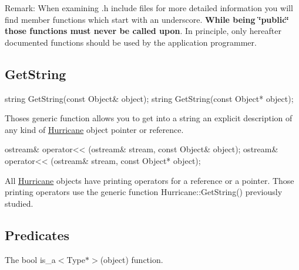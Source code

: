 \begin{DoxyParagraph}{Remark\+: When examining {\ttfamily }.h include files for more detailed information }
you will find member functions which start with an underscore. {\bfseries While being \char`\"{}public\char`\"{} those functions must never be called upon}. In principle, only here\textquotesingle{}after documented functions should be used by the application programmer.
\end{DoxyParagraph}
\hypertarget{group__Generalities_secGeneralitiesGetString}{}\subsection{Get\+String}\label{group__Generalities_secGeneralitiesGetString}

\begin{DoxyCode}
\textcolor{keywordtype}{string} GetString(\textcolor{keyword}{const} Object& \textcolor{keywordtype}{object});
\textcolor{keywordtype}{string} GetString(\textcolor{keyword}{const} Object* \textcolor{keywordtype}{object});
\end{DoxyCode}
 Thoses generic function allows you to get into a string an explicit description of any kind of \mbox{\hyperlink{namespaceHurricane}{Hurricane}} object pointer or reference. 
\begin{DoxyCode}
ostream& operator<< (ostream& stream, \textcolor{keyword}{const} Object& \textcolor{keywordtype}{object});
ostream& operator<< (ostream& stream, \textcolor{keyword}{const} Object* \textcolor{keywordtype}{object});
\end{DoxyCode}
 All \mbox{\hyperlink{namespaceHurricane}{Hurricane}} objects have printing operators for a reference or a pointer. Those printing operators use the generic function Hurricane\+::\+Get\+String() previously studied.\hypertarget{group__Generalities_secGeneralitiesPredicates}{}\subsection{Predicates}\label{group__Generalities_secGeneralitiesPredicates}
The {\ttfamily bool} {\ttfamily is\+\_\+a$<$\+Type$\ast$$>$(object)} function.

